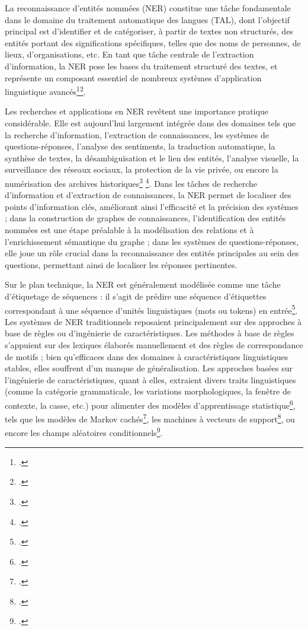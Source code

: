 \documentclass[a4paper,twoside,12pt]{book}
\begin{document}
La reconnaissance d'entités nommées (NER) constitue une tâche fondamentale dans le domaine du traitement automatique des langues (TAL), dont l'objectif principal est d'identifier et de catégoriser, à partir de textes non structurés, des entités portant des significations spécifiques, telles que des noms de personnes, de lieux, d'organisations, etc. En tant que tâche centrale de l'extraction d'information, la NER pose les bases du traitement structuré des textes, et représente un composant essentiel de nombreux systèmes d'application linguistique avancés\footcite{li2024}\footcite{keraghel2024}.

Les recherches et applications en NER revêtent une importance pratique considérable. Elle est aujourd'hui largement intégrée dans des domaines tels que la recherche d'information, l'extraction de connaissances, les systèmes de questions-réponses, l'analyse des sentiments, la traduction automatique, la synthèse de textes, la désambiguïsation et le lien des entités, l'analyse visuelle, la surveillance des réseaux sociaux, la protection de la vie privée, ou encore la numérisation des archives historiques\footcite{warto2024} \footcite{yang2024}. Dans les tâches de recherche d'information et d'extraction de connaissances, la NER permet de localiser des points d'information clés, améliorant ainsi l'efficacité et la précision des systèmes ; dans la construction de graphes de connaissances, l'identification des entités nommées est une étape préalable à la modélisation des relations et à l'enrichissement sémantique du graphe ; dans les systèmes de questions-réponses, elle joue un rôle crucial dans la reconnaissance des entités principales au sein des questions, permettant ainsi de localiser les réponses pertinentes.

Sur le plan technique, la NER est généralement modélisée comme une tâche d'étiquetage de séquences : il s'agit de prédire une séquence d'étiquettes correspondant à une séquence d'unités linguistiques (mots ou tokens) en entrée\footcite{li2024}. Les systèmes de NER traditionnels reposaient principalement sur des approches à base de règles ou d'ingénierie de caractéristiques. Les méthodes à base de règles s'appuient sur des lexiques élaborés manuellement et des règles de correspondance de motifs ; bien qu'efficaces dans des domaines à caractéristiques linguistiques stables, elles souffrent d'un manque de généralisation. Les approches basées sur l'ingénierie de caractéristiques, quant à elles, extraient divers traits linguistiques (comme la catégorie grammaticale, les variations morphologiques, la fenêtre de contexte, la casse, etc.) pour alimenter des modèles d'apprentissage statistique\footcite{yang2024}, tels que les modèles de Markov cachés\footcite{eddy1996}, les machines à vecteurs de support\footcite{hearst1998}, ou encore les champs aléatoires conditionnels\footcite{lafferty}.
\end{document}
